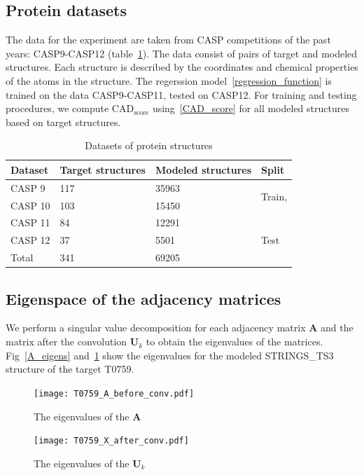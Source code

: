 \documentclass[12pt,twosides]{extarticle}
\begin{document}
\subsection{Protein datasets}
The data for the experiment are taken from CASP competitions of the past years: CASP9-CASP12 (table~\ref{table:student}). The data consist of pairs of target and modeled structures. Each structure is described by the coordinates and chemical properties of the atoms in the structure. The regerssion model~\eqref{regression_function} is trained on the data CASP9-CASP11, tested on CASP12. For training and testing procedures, we compute $\text{CAD}_\text{score}$ using~\eqref{CAD_score} for all modeled structures based on target structures.

\begin{table}[H]
	\centering
	\caption{Datasets of protein structures}
	\begin{tabular}{p{28mm}|p{26mm}p{26mm}|p{28mm}}
		\hline Dataset & Target structures & Modeled structures& Split\\
		\hline 
		CASP 9 & 117 & 35963 &  \multirow{2}{*}{Train,} \\
		CASP 10 & 103 & 15450 & \multirow{2}{*}{Validation} \\
		CASP 11 & 84 & 12291 &  \\
		\hline 
		CASP 12 & 37 & 5501 & {Test} \\
		\hline
		Total & 341 & 69205 &
	\end{tabular}
	\label{table:student}
\end{table}


\subsection{Eigenspace of the adjacency matrices}

We perform a singular value decomposition for each adjacency matrix $\textbf{A}$ and the matrix after the convolution $\textbf{U}_k$ to obtain the eigenvalues of the matrices. Fig~\ref{A_eigens} and~\ref{u_k_eigens} show the eigenvalues for the modeled STRINGS\_TS3 structure of the target T0759.

\begin{figure}[H]
	\begin{minipage}[b]{0.49\textwidth}
		\centering
		\texttt{[image: T0759\_A\_before\_conv.pdf]}
		\caption{The eigenvalues of the $\textbf{A}$}
		\label{A_eigens}
	\end{minipage}
	\hfill
	\begin{minipage}[b]{0.49\textwidth}
		\centering
		\texttt{[image: T0759\_X\_after\_conv.pdf]}
		\caption{The eigenvalues of the $\textbf{U}_k$}
		\label{u_k_eigens}
	\end{minipage}
\end{figure}
\end{document}
